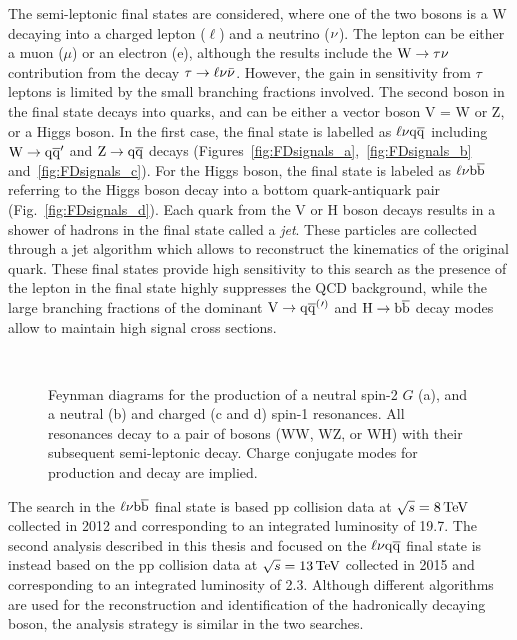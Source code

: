 The semi-leptonic final states are considered, where one of the two bosons is a W decaying into a charged lepton ($\ell$) and a neutrino ($\nu$).
The lepton can be either a muon ($\mu$) or an electron (e), although the results include the $\mathrm{W}\to\tau\nu$ contribution from the decay $\tau\to\ell\nu\bar{\nu}$.
However, the gain in sensitivity from $\tau$ leptons is limited by the small branching fractions involved.
The second boson in the final state decays into quarks, and can be either a vector boson V = W or Z,
or a Higgs boson. In the first case, the final state is labelled as $\ell\nu\mathrm{q}\overline{\mathrm{q}}$ including $\mathrm{W}\to\mathrm{q}\overline{\mathrm{q}}^\prime$ and $\mathrm{Z}\to\mathrm{q}\overline{\mathrm{q}}$ decays (Figures~\ref{fig:FDsignals_a},~\ref{fig:FDsignals_b} and~\ref{fig:FDsignals_c}).
For the Higgs boson, the final state is labeled as $\ell\nu{\mathrm{b}\overline{\mathrm{b}}}$ referring to the Higgs boson decay into a bottom quark-antiquark pair (Fig.~\ref{fig:FDsignals_d}).
Each quark from the V or H boson decays results in a shower of hadrons in the final state called a \textit{jet}. These particles are collected through a jet algorithm which allows to reconstruct the kinematics of the original quark.
These final states provide high sensitivity to this search as the presence of the lepton in the final state highly suppresses the QCD background, while the large branching fractions of the dominant $\mathrm{V}\to\mathrm{q}\overline{\mathrm{q}}^({}'^){}$ and $\mathrm{H}\to{\mathrm{b}\overline{\mathrm{b}}}$ decay modes allow to maintain high signal cross sections.

\begin{figure}[!htb]
\centering
{}\hspace{1cm}
\\
\hspace{1cm}
\caption{Feynman diagrams for the production of a neutral spin-2 $G$ (a), and a neutral \Zpr (b) and charged \Wpr (c and d) spin-1 resonances.
All resonances decay to a pair of bosons (WW, WZ, or WH) with their subsequent semi-leptonic decay. Charge conjugate modes for \Wpr production and decay are implied.}
\label{fig:FDsignals}
\end{figure}

The search in the $\ell\nu{\mathrm{b}\overline{\mathrm{b}}}$ final state is based pp collision data at $\sqrt{s} = 8\,\text{Te\hspace{-.08em}V}$ collected in 2012 and corresponding to an integrated luminosity of 19.7\fbinv.
The second analysis described in this thesis and focused on the $\ell\nu\mathrm{q}\overline{\mathrm{q}}$ final state is instead based on the pp collision data at $\sqrt{s} = 13\,\text{Te\hspace{-.08em}V}$
collected in 2015 and corresponding to an integrated luminosity of 2.3\fbinv.
Although different algorithms are used for the reconstruction and identification of the hadronically decaying boson, the analysis strategy is similar in the two searches.\\

